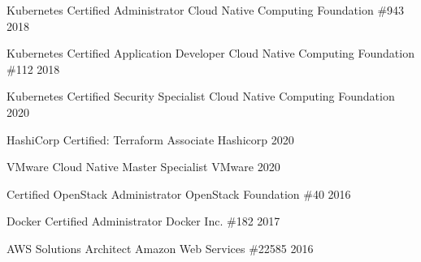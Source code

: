 

\begin{cvhonors}

\cvhonor
    {Kubernetes Certified Administrator}
    {Cloud Native Computing Foundation}
    {\#943}
    {2018} %

  \cvhonor
    {Kubernetes Certified Application Developer}
    {Cloud Native Computing Foundation}
    {\#112}
    {2018} %

  \cvhonor
    {Kubernetes Certified Security Specialist}
    {Cloud Native Computing Foundation}
    {}
    {2020} %

\cvhonor
    {HashiCorp Certified: Terraform Associate}
    {Hashicorp}
    {}
    {2020} %

\cvhonor
    {VMware Cloud Native Master Specialist}
    {VMware}
    {}
    {2020} %

  \cvhonor
    {Certified OpenStack Administrator}
    {OpenStack Foundation}
    {\#40}
    {2016} %

  \cvhonor
    {Docker Certified Administrator}
    {Docker Inc.}
    {\#182}
    {2017} %

  \cvhonor
    {AWS Solutions Architect}
    {Amazon Web Services}
    {\#22585}
    {2016} %


\end{cvhonors}

